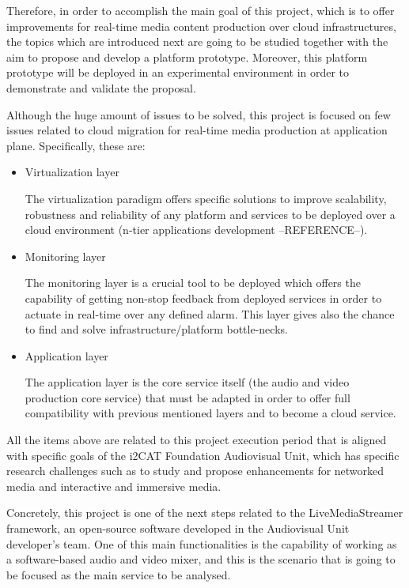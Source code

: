 Therefore, in order to accomplish the main goal of this project, which is to offer improvements for real-time media content production over cloud infrastructures, the topics which are introduced next are going to be studied together with the aim to propose and develop a platform prototype. Moreover, this platform prototype will be deployed in an experimental environment in order to demonstrate and validate the proposal.

Although the huge amount of issues to be solved, this project is focused on few issues related to cloud migration for real-time media production at application plane. Specifically, these are:

\begin{itemize}
\item Virtualization layer \hfill 

The virtualization paradigm offers specific solutions to improve scalability, robustness and reliability of any platform and services to be deployed over a cloud environment (n-tier applications development --REFERENCE--). 

\item Monitoring layer \hfill 

The monitoring layer is a crucial tool to be deployed which offers the capability of getting non-stop feedback from deployed services in order to actuate in real-time over any defined alarm. This layer gives also the chance to find and solve infrastructure/platform bottle-necks.

\item Application layer \hfill 

The application layer is the core service itself (the audio and video production core service) that must be adapted in order to offer full compatibility with previous mentioned layers and to become a cloud service.

\end{itemize}

All the items above are related to this project execution period that is aligned with specific goals of the i2CAT Foundation Audiovisual Unit, which has specific research challenges such as to study and propose enhancements for networked media and interactive and immersive media. 

Concretely, this project is one of the next steps related to the LiveMediaStreamer framework, an open-source software developed in the Audiovisual Unit developer's team. One of this main functionalities is the capability of working as a software-based audio and video mixer, and this is the scenario that is going to be focused as the main service to be analysed.

